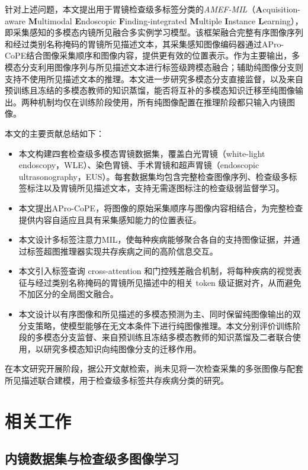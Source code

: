 \documentclass[Afour,sagev,times]{sagej}
\begin{document}
针对上述问题，本文提出用于胃镜检查级多标签分类的\textit{AMEF-MIL}（\textbf{A}cquisition-aware \textbf{M}ultimodal \textbf{E}ndoscopic \textbf{F}inding-integrated \textbf{M}ultiple \textbf{I}nstance \textbf{L}earning），即采集感知的多模态内镜所见融合多实例学习模型。该框架融合完整有序图像序列和经过类别名称掩码的胃镜所见描述文本，其采集感知图像编码器通过APro-CoPE结合图像采集顺序和图像内容，提供更有效的位置表示。作为主要输出，多模态分支利用图像序列与所见描述文本进行标签级跨模态融合；辅助纯图像分支则支持不使用所见描述文本的推理。本文进一步研究多模态分支直接监督，以及来自预训练且冻结的多模态教师的知识蒸馏，能否将互补的多模态知识迁移至纯图像输出。两种机制均仅在训练阶段使用，所有纯图像配置在推理阶段都只输入内镜图像。

本文的主要贡献总结如下：
\begin{itemize}
    \item 本文构建四套检查级多模态胃镜数据集，覆盖白光胃镜（white-light endoscopy，WLE）、染色胃镜、手术胃镜和超声胃镜（endoscopic ultrasonography，EUS）。每套数据集均包含完整检查图像序列、检查级多标签标注以及胃镜所见描述文本，支持无需逐图标注的检查级弱监督学习。
    \item 本文提出APro-CoPE，将图像的原始采集顺序与图像内容相结合，为完整检查提供内容自适应且具有采集感知能力的位置表征。
    \item 本文设计多标签注意力MIL，使每种疾病能够聚合各自的支持图像证据，并通过标签超图推理器实现共存疾病之间的高阶信息交互。
    \item 本文引入标签查询 cross-attention 和门控残差融合机制，将每种疾病的视觉表征与经过类别名称掩码的胃镜所见描述中的相关 token 级证据对齐，从而避免不加区分的全局图文融合。
    \item 本文设计以有序图像和所见描述的多模态预测为主、同时保留纯图像输出的双分支策略，使模型能够在无文本条件下进行纯图像推理。本文分别评价训练阶段的多模态分支监督、来自预训练且冻结多模态教师的知识蒸馏及二者联合使用，以研究多模态知识向纯图像分支的迁移作用。
\end{itemize}

在本文研究开展阶段，据公开文献检索，尚未见将一次检查采集的多张图像与配套所见描述联合建模，用于检查级多标签共存疾病分类的研究。

\section{相关工作}

\subsection{内镜数据集与检查级多图像学习}
\end{document}
